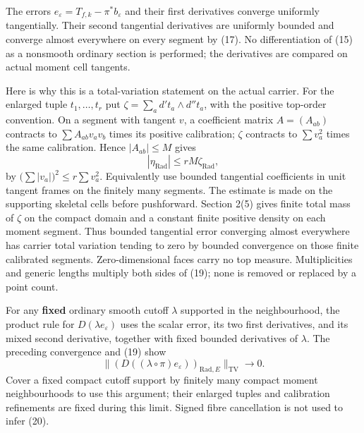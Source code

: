 \documentclass[
  11pt,
]{article}
\begin{document}
The errors \(e_\varepsilon=T_{f,k}-\pi^*b_\varepsilon\) and their first
derivatives converge uniformly tangentially. Their second tangential
derivatives are uniformly bounded and converge almost everywhere on
every segment by (17). No differentiation of (15) as a nonsmooth
ordinary section is performed; the derivatives are compared on actual
moment cell tangents.

Here is why this is a total-variation statement on the actual carrier.
For the enlarged tuple \(t_1,\ldots,t_r\) put
\(\zeta=\sum_a d't_a\wedge d''t_a\), with the positive top-order
convention. On a segment with tangent \(v\), a coefficient matrix
\(A=(A_{ab})\) contracts to \(\sum A_{ab}v_av_b\) times its positive
calibration; \(\zeta\) contracts to \(\sum v_a^2\) times the same
calibration. Hence \(|A_{ab}|\le M\) gives \[
       |\eta_{\mathrm{Rad}}|\le rM\zeta_{\mathrm{Rad}},    \tag{19}
\] by \(\big(\sum|v_a|\big)^2\le r\sum v_a^2\). Equivalently use bounded
tangential coefficients in unit tangent frames on the finitely many
segments. The estimate is made on the supporting skeletal cells before
pushforward. Section 2(5) gives finite total mass of \(\zeta\) on the
compact domain and a constant finite positive density on each moment
segment. Thus bounded tangential error converging almost everywhere has
carrier total variation tending to zero by bounded convergence on those
finite calibrated segments. Zero-dimensional faces carry no top measure.
Multiplicities and generic lengths multiply both sides of (19); none is
removed or replaced by a point count.

For any \textbf{fixed} ordinary smooth cutoff \(\lambda\) supported in
the neighbourhood, the product rule for \(D(\lambda e_\varepsilon)\)
uses the scalar error, its two first derivatives, and its mixed second
derivative, together with fixed bounded derivatives of \(\lambda\). The
preceding convergence and (19) show \[
       \big\|(D((\lambda\circ\pi)e_\varepsilon))_{
                          \mathrm{Rad},E}\big\|_{\mathrm{TV}}
                                 \longrightarrow0.       \tag{20}
\] Cover a fixed compact cutoff support by finitely many compact moment
neighbourhoods to use this argument; their enlarged tuples and
calibration refinements are fixed during this limit. Signed fibre
cancellation is not used to infer (20).
\end{document}
